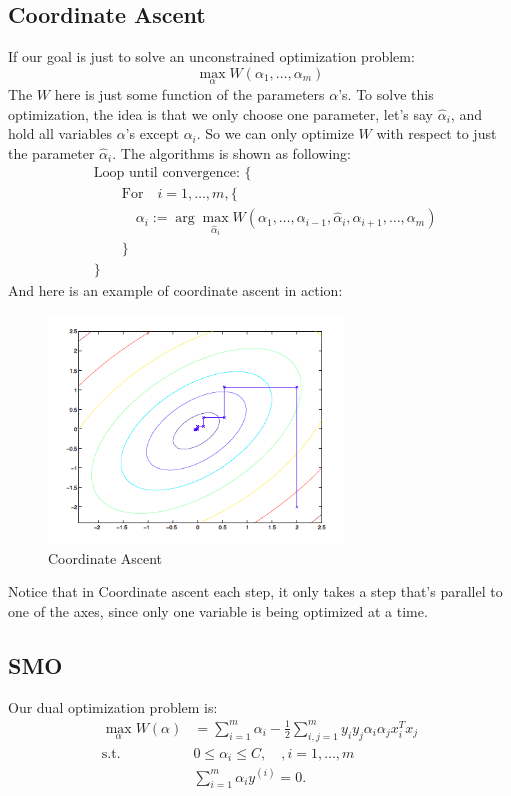 \documentclass[a4paper]{article}
\begin{document}
\subsection{Coordinate Ascent}
If our goal is just to solve an unconstrained optimization problem:
$$
	\max_\alpha W(\alpha_1, \dots, \alpha_m)
$$
The $W$ here is just some function of the parameters $\alpha$'s. To solve this optimization, the idea is that we only choose one parameter, let's say $\hat{\alpha}_i$, and hold all variables $\alpha$'s except $\alpha_i$. So we can only optimize $W$ with respect to just the parameter $\hat{\alpha}_i$. The algorithms is shown as following:
\begin{align*}
	&\text{Loop until convergence: \{} \\
	& \quad \quad \text{For} \quad i = 1, \dots, m, \{ \\
	& \quad \quad \quad \alpha_i := \arg \max_{\hat{\alpha}_i} W(\alpha_1, \dots, \alpha_{i-1}, \hat{\alpha}_i, \alpha_{i+1}, \dots, \alpha_m) \\
	& \quad \quad \} \\
	&\}
\end{align*}
And here is an example of coordinate ascent in action:
\begin{figure}[h!]
  \centering
    \includegraphics[width=0.7\textwidth]{./images/coordinate}
  \caption{Coordinate Ascent}\label{fig:coordinate}
\end{figure}
Notice that in Coordinate ascent each step, it only takes a step that's parallel to one of the axes, since only one variable is being optimized at a time.

\subsection{SMO}
Our dual optimization problem is:
\begin{align}
	\max_{\alpha} W(\alpha) &= \sum_{i=1}^{m} \alpha_i - \frac{1}{2} \sum_{i,j=1}^{m} y_i y_j \alpha_i \alpha_j x_i^T x_j	\\
		\text{s.t.} \quad & 0 \leq \alpha_i \leq C, \quad, i = 1, \dots, m  \\
		& \sum_{i=1}^{m} \alpha_i y^{(i)} = 0. 
\end{align}
\end{document}
